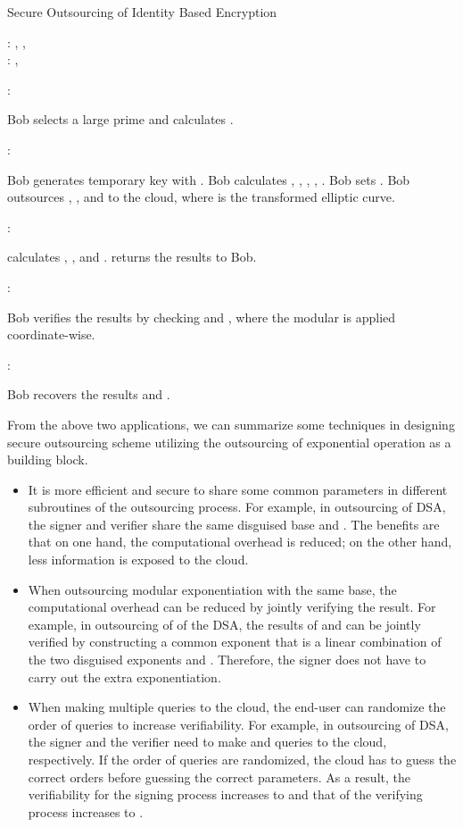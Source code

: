 \documentclass[english,draftcls,onecolumn,11pt]{IEEEtran}
\theoremstyle{definition}
\theoremstyle{plain}
\theoremstyle{plain}
\theoremstyle{definition}
\begin{document}
\begin{algorithm}[tbh] 
\caption{Secure Outsourcing of Identity Based Encryption\label{alg:SecureIBE}}

: , , \\
: , 

:  
\begin{algorithmic}[1] 
\STATE Bob selects a large prime  and calculates . 
\end{algorithmic} 
\smallskip 
:  
\begin{algorithmic}[1] 
\STATE Bob generates temporary key  with .
\STATE Bob calculates , , , , . Bob sets .
\STATE Bob outsources , ,  and  to the
cloud, where  is the transformed elliptic curve.
\end{algorithmic} 

\smallskip
:
\begin{algorithmic}[1] 
\STATE  calculates , ,  and .  
\STATE  returns the results  to Bob.
\end{algorithmic} 

\smallskip
:
\begin{algorithmic}[1] 
\STATE Bob verifies the results by checking  and , where the modular is applied coordinate-wise.
\end{algorithmic} 

\smallskip
:
\begin{algorithmic}[1] 
\STATE Bob  recovers the results  and .
\end{algorithmic} 
\end{algorithm}

From the above two applications, we can summarize some techniques
in designing secure outsourcing scheme utilizing the outsourcing of
exponential operation as a building block.
\begin{itemize}
\item It is more efficient and secure to share some common parameters in
different subroutines of the outsourcing process. For example, in
outsourcing of DSA, the signer and verifier share the same disguised
base  and . The benefits are that on one hand, the computational
overhead is reduced; on the other hand, less information is exposed
to the cloud. 
\item When outsourcing modular exponentiation with the same base, the computational
overhead can be reduced by jointly verifying the result. For example,
in outsourcing of of the DSA, the results of  and 
can be jointly verified by constructing a common exponent 
that is a linear combination of the two disguised exponents  and
. Therefore, the signer does not have to carry out the extra exponentiation.
\item When making multiple queries to the cloud, the end-user can randomize
the order of queries to increase verifiability. For example, in outsourcing
of DSA, the signer and the verifier need to make  and  queries
to the cloud, respectively. If the order of queries are randomized,
the cloud has to guess the correct orders before guessing the correct
parameters. As a result, the verifiability for the signing process
increases to  and that of the verifying process
increases to . 
\end{itemize}
\end{document}
